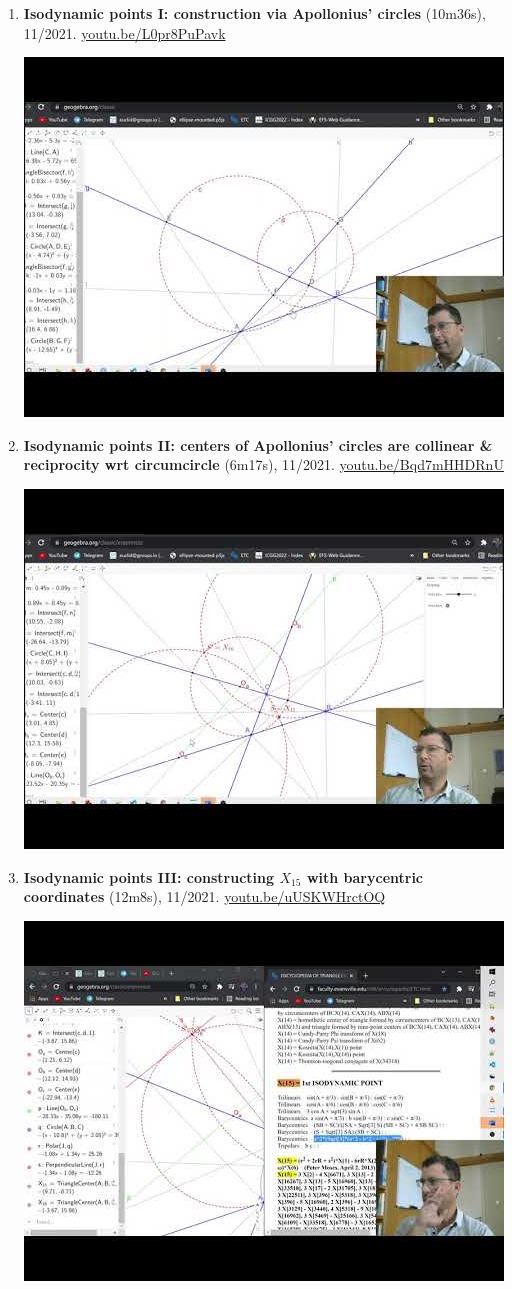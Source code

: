\documentclass[12pt]{article}
\begin{document}
\begin{enumerate}[resume]
\item \textbf{Isodynamic points I: construction via Apollonius' circles} (10m36s), 11/2021. \href{https://youtu.be/L0pr8PuPavk}{\url{youtu.be/L0pr8PuPavk}}
\begin{center}\includegraphics[width=.5\textwidth]{pics/L0pr8PuPavk.jpg}\end{center}
% 
\item \textbf{Isodynamic points II: centers of Apollonius' circles are collinear \& reciprocity wrt circumcircle} (6m17s), 11/2021. \href{https://youtu.be/Bqd7mHHDRnU}{\url{youtu.be/Bqd7mHHDRnU}}
\begin{center}\includegraphics[width=.5\textwidth]{pics/Bqd7mHHDRnU.jpg}\end{center}
% 
\item \textbf{Isodynamic points III: constructing $X_{15}$ with barycentric coordinates} (12m8s), 11/2021. \href{https://youtu.be/uUSKWHrctOQ}{\url{youtu.be/uUSKWHrctOQ}}
\begin{center}\includegraphics[width=.5\textwidth]{pics/uUSKWHrctOQ.jpg}\end{center}

\end{enumerate}
\end{document}
